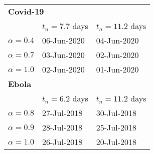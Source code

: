 \begin{tabular}{lll} 
\hline
\multicolumn{3}{l}{ \bf Covid-19} \\ 
 &  $t_n=7.7$ days & $t_n=11.2$ days \\ 
$\alpha=0.4$ & 06-Jun-2020 & 04-Jun-2020 \\ 
 $\alpha=0.7$ & 03-Jun-2020 & 02-Jun-2020 \\ 
 $\alpha=1.0$ & 02-Jun-2020 & 01-Jun-2020 \\ 
 \hline
\multicolumn{3}{l}{ \bf Ebola} \\ 
 &  $t_n=6.2$ days & $t_n=11.2$ days \\ 
$\alpha=0.8$ & 27-Jul-2018 & 30-Jul-2018 \\ 
 $\alpha=0.9$ & 28-Jul-2018 & 25-Jul-2018 \\ 
 $\alpha=1.0$ & 26-Jul-2018 & 20-Jul-2018 \\ 
 \hline
\end{tabular} 
